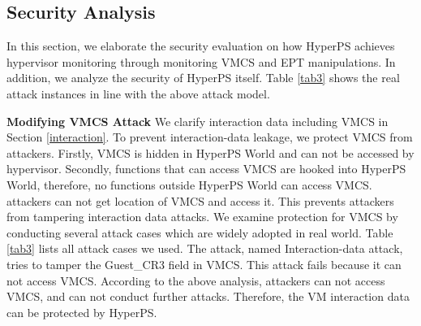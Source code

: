 \documentclass[conference]{IEEEtran}
\begin{document}
\subsection{Security Analysis}
 
In this section, we elaborate the security evaluation on how HyperPS achieves hypervisor monitoring through monitoring VMCS and EPT manipulations. 
In addition, we analyze the security of HyperPS itself. Table \ref{tab3} shows the real attack instances in line with the above attack model. 



\textbf{Modifying VMCS Attack}
We clarify interaction data including VMCS in Section \ref{interaction}.
 To prevent interaction-data leakage, we protect VMCS from attackers. Firstly, VMCS is hidden in HyperPS World and can not be accessed by hypervisor. Secondly, functions that can access VMCS are hooked into HyperPS World, therefore, no functions outside HyperPS World can access VMCS. attackers can not get location of VMCS and access it. This prevents attackers from tampering interaction data attacks. We examine protection for VMCS by conducting several attack cases which are widely adopted in real world. Table \ref{tab3} lists all attack cases we used. The attack, named Interaction-data attack, tries to tamper the Guest\_CR3 field in VMCS. This attack fails because it can not access VMCS. 
  According to the above analysis, attackers can not access VMCS, and can not conduct further attacks. Therefore, the VM interaction data can be protected by HyperPS.
\end{document}
